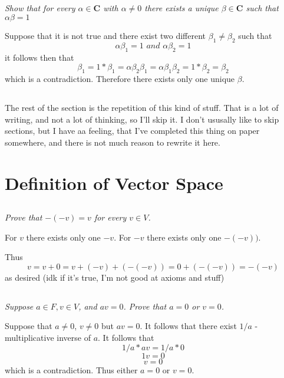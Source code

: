 \documentclass[11pt,oneside,titlepage]{book}
\begin{document}
\subsection{}
\textit{Show that for every $\alpha \in \textbf{C}$ with $\alpha \neq 0$
  there exists a unique $\beta \in \textbf{C}$ such that $\alpha \beta = 1$}

Suppose that it is not true and there exist two different
$\beta_1 \neq \beta_2$ such that
$$\alpha \beta_1 = 1 \textit{ and } \alpha \beta_2 = 1$$
it follows then that 
$$\beta_1 = 1 *  \beta_1 = \alpha \beta_2 \beta_1  =
\alpha \beta_1 \beta_2 = 1 * \beta_2 = \beta_2$$
which is a contradiction. Therefore there exists only one unique $\beta$.

\subsection{}
The rest of the section is the repetition of this kind of stuff.
That is a lot of writing, and not a lot of thinking, so I'll skip it.
I don't ususally like to skip sections, but I have  aa feeling, that I've
completed this thing on paper somewhere, and there is not much reason to
rewrite it here.

\section{Definition of Vector Space}

\subsection{}
\textit{Prove that $-(-v)= v$ for every $v \in V$.}

For $v$ there exists only one $-v$. For $-v$ there exists only one $-(-v))$.

Thus
$$v = v + 0 = v + (-v) + (-(-v)) = 0 + (-(-v)) = -(-v)$$
as desired (idk if it's true, I'm not good at axioms and stuff)

\subsection{}
\textit{Suppose $a \in F, v \in V$, and $av = 0$. Prove that
  $a = 0$ or $v = 0$.}

Suppose that $a \neq 0$, $v \neq 0$ but $av = 0$. It follows that there
exist $1/a$ - multiplicative inverse of $a$. It follows that
$$1/a * av = 1/a * 0$$
$$1v = 0$$
$$v = 0$$
which is a contradiction. Thus either $a = 0$ or $v = 0$.
\end{document}
